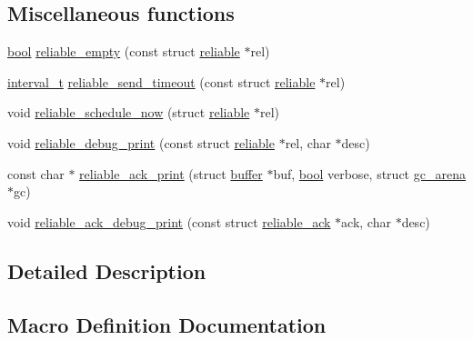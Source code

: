 \subsection*{Miscellaneous functions}
\begin{DoxyCompactItemize}
\item 
\hyperlink{automatic_8c_abb452686968e48b67397da5f97445f5b}{bool} \hyperlink{group__reliable_ga7e0186d08bdeb59563ce37578ee64f8d}{reliable\+\_\+empty} (const struct \hyperlink{structreliable}{reliable} $\ast$rel)
\item 
\hyperlink{common_8h_a3d8621f960ada51a5ad9ff181730481a}{interval\+\_\+t} \hyperlink{group__reliable_ga9e8edfca42338da6da6ccb3fd1849dca}{reliable\+\_\+send\+\_\+timeout} (const struct \hyperlink{structreliable}{reliable} $\ast$rel)
\item 
void \hyperlink{group__reliable_ga14cb4395f780502ae9edbe6d3f90aec5}{reliable\+\_\+schedule\+\_\+now} (struct \hyperlink{structreliable}{reliable} $\ast$rel)
\item 
void \hyperlink{group__reliable_ga864d5a93bec5ac5554ce9481d1551197}{reliable\+\_\+debug\+\_\+print} (const struct \hyperlink{structreliable}{reliable} $\ast$rel, char $\ast$desc)
\item 
const char $\ast$ \hyperlink{group__reliable_ga6b9917d2ee4fe23f48f4471e8f4f4fdd}{reliable\+\_\+ack\+\_\+print} (struct \hyperlink{structbuffer}{buffer} $\ast$buf, \hyperlink{automatic_8c_abb452686968e48b67397da5f97445f5b}{bool} verbose, struct \hyperlink{structgc__arena}{gc\+\_\+arena} $\ast$gc)
\item 
void \hyperlink{group__reliable_ga1e35eb4bd321de7b34aa1f086451f724}{reliable\+\_\+ack\+\_\+debug\+\_\+print} (const struct \hyperlink{structreliable__ack}{reliable\+\_\+ack} $\ast$ack, char $\ast$desc)
\end{DoxyCompactItemize}


\subsection{Detailed Description}


\subsection{Macro Definition Documentation}
\hypertarget{group__reliable_gacb891f0bfc023839a53a2c7005cd340c}{}
